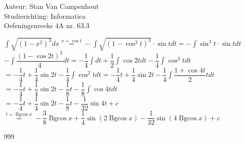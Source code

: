 \documentclass[a4paper]{article}
\begin{document}
  
\noindent \large Auteur: Stan Van Campenhout \\
\noindent \large Studierichting:  Informatica\\
\noindent \large Oefeningenreeks 4A nr. 63.3\\

\medskip

\normalsize

$ \displaystyle\int\sqrt{\left(1-x^2\right)^3}dx \stackrel{x = \cos t}{=} -\displaystyle\int\sqrt{\left(1-\cos^2 t\right)^3}\cdot\sin tdt 
= -\displaystyle\int\sin^3t\cdot\sin tdt $\\

$ -\displaystyle\int\dfrac{\left(1-\cos 2t\right)^2}{4}dt = -\dfrac{1}{4}\displaystyle\int dt +\dfrac{1}{2}\displaystyle\int\cos 2tdt - \dfrac{1}{4}\displaystyle\int\cos^2tdt $\\

$ = -\dfrac{1}{4}t +\dfrac{1}{4}\sin 2t - \dfrac{1}{4}\displaystyle\int\cos^2tdt = -\dfrac{1}{4}t +\dfrac{1}{4}\sin 2t - \dfrac{1}{4}\displaystyle\int\dfrac{1+\cos 4t}{2}tdt $\\

$ = -\dfrac{1}{4}t +\dfrac{1}{4}\sin 2t - \dfrac{1}{8}t - \dfrac{1}{8}\displaystyle\int\cos 4tdt $\\

$ = -\dfrac{1}{4}t +\dfrac{1}{4}\sin 2t - \dfrac{1}{8}t - \dfrac{1}{32}\sin 4t + c $\\

$ \stackrel{t = \operatorname{Bgcos}x}{=} 
-\dfrac{3}{8}\operatorname{Bgcos}x +\dfrac{1}{4}\sin \left(2\operatorname{Bgcos}x\right) - \dfrac{1}{32}\sin\left(4\operatorname{Bgcos}x\right) + c $\\

\begin{thebibliography}{999}
\end{thebibliography}
\end{document}
